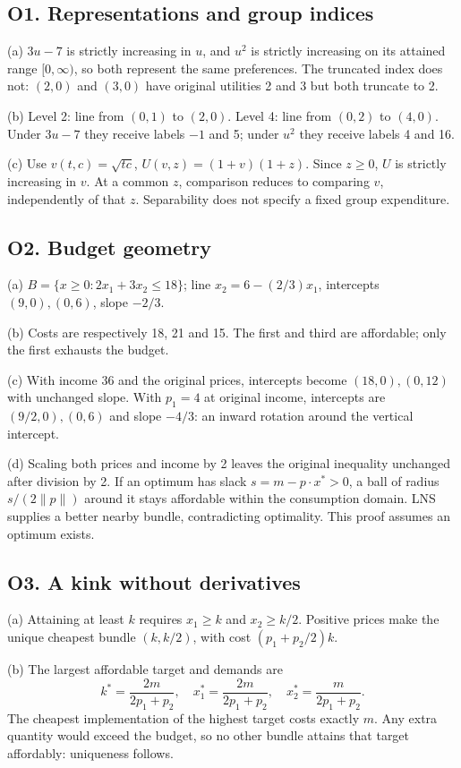 \subsection*{O1. Representations and group indices}
(a) $3u-7$ is strictly increasing in $u$, and $u^2$ is strictly increasing on its attained range $[0,\infty)$, so both represent the same preferences. The truncated index does not: $(2,0)$ and $(3,0)$ have original utilities 2 and 3 but both truncate to 2.

(b) Level 2: line from $(0,1)$ to $(2,0)$. Level 4: line from $(0,2)$ to $(4,0)$. Under $3u-7$ they receive labels $-1$ and 5; under $u^2$ they receive labels 4 and 16.

(c) Use $v(t,c)=\sqrt{tc}$, $U(v,z)=(1+v)(1+z)$. Since $z\ge0$, $U$ is strictly increasing in $v$. At a common $z$, comparison reduces to comparing $v$, independently of that $z$. Separability does not specify a fixed group expenditure. 
\subsection*{O2. Budget geometry}
(a) $B=\{x\ge0:2x_1+3x_2\le18\}$; line $x_2=6-(2/3)x_1$, intercepts $(9,0),(0,6)$, slope $-2/3$.

(b) Costs are respectively 18, 21 and 15. The first and third are affordable; only the first exhausts the budget.

(c) With income 36 and the original prices, intercepts become $(18,0),(0,12)$ with unchanged slope. With $p_1=4$ at original income, intercepts are $(9/2,0),(0,6)$ and slope $-4/3$: an inward rotation around the vertical intercept.

(d) Scaling both prices and income by 2 leaves the original inequality unchanged after division by 2. If an optimum has slack $s=m-p\cdot x^*>0$, a ball of radius $s/(2\|p\|)$ around it stays affordable within the consumption domain. LNS supplies a better nearby bundle, contradicting optimality. This proof assumes an optimum exists. 

\clearpage
\subsection*{O3. A kink without derivatives}
(a) Attaining at least $k$ requires $x_1\ge k$ and $x_2\ge k/2$. Positive prices make the unique cheapest bundle $(k,k/2)$, with cost $(p_1+p_2/2)k$.

(b) The largest affordable target and demands are
\[
 k^*=\frac{2m}{2p_1+p_2},\quad
 x_1^*=\frac{2m}{2p_1+p_2},\quad x_2^*=\frac{m}{2p_1+p_2}.
\]
The cheapest implementation of the highest target costs exactly $m$. Any extra quantity would exceed the budget, so no other bundle attains that target affordably: uniqueness follows.

